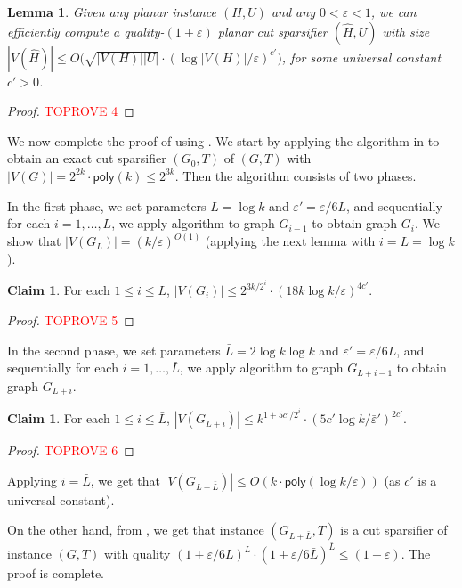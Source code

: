\documentclass[11pt]{article}
\newtheorem{lemma}[theorem]{Lemma}
\theoremstyle{definition}
\newtheorem{claim}[theorem]{Claim}
\newcommand{\eps}{{\varepsilon}}
\newcommand{\poly}{\mathsf{poly}}
\begin{document}
\begin{lemma}
\label{lem: recursive}
Given any planar instance $(H,U)$ and any $0<\eps<1$, we can efficiently compute a quality-$(1+\eps)$ planar cut sparsifier $(\hat H, U)$ with size $|V(\hat H)|\le O\big(\sqrt{|V(H)| |U|}\cdot (\log |V(H)|/\eps)^{c'}\big)$, for some universal constant $c'>0$.
\end{lemma}

\begin{proof}\textcolor{red}{TOPROVE 4}\end{proof}


We now complete the proof of  using . We start by applying the algorithm in \cite{krauthgamer2017refined} to obtain an exact cut sparsifier $(G_0,T)$ of $(G,T)$ with $|V(G)|=2^{2k}\cdot \poly(k)\le 2^{3k}$.
Then the algorithm consists of two phases.

In the first phase, we set parameters $L=\log k$ and $\eps'=\eps/6L$, and sequentially for each $i=1,\ldots,L$, we apply algorithm  to graph $G_{i-1}$ to obtain graph $G_i$.
We show that $|V(G_L)|=(k/\eps)^{O(1)}$ (applying the next lemma with $i=L=\log k$).

\begin{claim}
For each $1\le i\le L$, $|V(G_i)|\le 2^{3k/2^i}\cdot (18k\log k/\eps)^{4c'}$.
\end{claim}
\begin{proof}\textcolor{red}{TOPROVE 5}\end{proof}

In the second phase, we set parameters $\bar L=2\log k\log k$ and $\bar\eps'=\eps/6L$, and sequentially for each $i=1,\ldots,\bar L$, we apply algorithm  to graph $G_{L+i-1}$ to obtain graph $G_{L+i}$.

\begin{claim}
	For each $1\le i\le \bar L$, $|V(G_{L+i})|\le k^{1+5c'/2^i}\cdot (5c'\log k/\bar\eps')^{2c'}$.
\end{claim}
\begin{proof}\textcolor{red}{TOPROVE 6}\end{proof}
Applying $i=\bar L$, we get that $|V(G_{L+\bar L})|\le O(k\cdot \poly(\log k/\eps))$ (as $c'$ is a universal constant).

On the other hand, from , we get that instance $(G_{L+\bar L},T)$ is a cut sparsifier of  instance $(G,T)$ with quality
$(1+\eps/6L)^L\cdot (1+\eps/6\bar L)^{\bar L}\le (1+\eps)$. The proof is complete.
\end{document}
